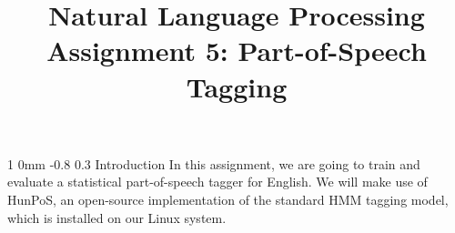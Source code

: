 \documentclass[11pt]{article}
\title{{\LARGE Natural Language Processing}\\[1.5mm]{\large Assignment 5: Part-of-Speech Tagging}}
\author{}
\date{} %
\makeatletter
\newcommand{\newsec}[2]{\section{#1}\label{sec:#2}\noindent}
\renewcommand{\section}{\@startsection
{section}%
{1}%
{0mm}%
{-0.8\baselineskip}%
{0.3\baselineskip}%
{\bfseries\large}}%
\makeatother
\begin{document}
 

\maketitle
\vspace{-2mm} \newsec{Introduction}{intro}%
In this assignment, we are going to train and evaluate a statistical
part-of-speech tagger for English. We will make use of HunPoS, an
open-source implementation of the standard HMM tagging model, which is
installed on our Linux system.
\end{document}
